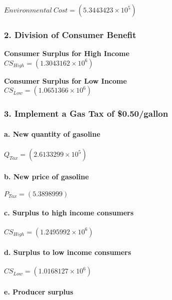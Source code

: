 \documentclass[]{article}
\let\oldparagraph\paragraph
\renewcommand{\paragraph}[1]{\oldparagraph{#1}\mbox{}}
\begin{document}
\(Environmental~Cost = (5.3443423\times 10^{5})\)

\subsubsection{2. Division of Consumer
Benefit}\label{division-of-consumer-benefit}

\textbf{Consumer Surplus for High Income}\\
\(CS_{High} = (1.3043162\times 10^{6})\)

\textbf{Consumer Surplus for Low Income}\\
\(CS_{Low} = (1.0651366\times 10^{6})\)

\subsubsection{3. Implement a Gas Tax of
\$0.50/gallon}\label{implement-a-gas-tax-of-0.50gallon}

\paragraph{a. New quantity of
gasoline}\label{a.-new-quantity-of-gasoline}

\(Q_{Tax} = (2.6133299\times 10^{5})\)

\paragraph{b. New price of gasoline}\label{b.-new-price-of-gasoline}

\(P_{Tax} = (5.3898999)\)

\paragraph{c. Surplus to high income
consumers}\label{c.-surplus-to-high-income-consumers}

\(CS_{High} = (1.2495992\times 10^{6})\)

\paragraph{d. Surplus to low income
consumers}\label{d.-surplus-to-low-income-consumers}

\(CS_{Low} = (1.0168127\times 10^{6})\)

\paragraph{e. Producer surplus}\label{e.-producer-surplus}
\end{document}
